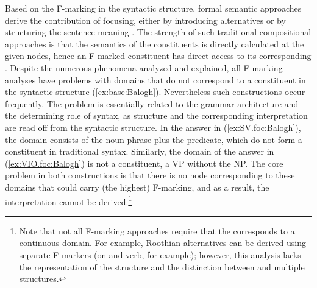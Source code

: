 \documentclass[output=paper,colorlinks,citecolor=brown]{langscibook}
\begin{document}
Based on the F-marking in the syntactic structure, formal semantic approaches derive the contribution of focusing, either by introducing alternatives \citep[see][]{rooth:92} or by structuring the sentence meaning \citep[see][]{vonstechow:91,krifka:01}. The strength of such traditional compositional approaches is that the semantics of the constituents is directly calculated at the given nodes, hence an F-marked constituent has direct access to its corresponding . Despite the numerous phenomena analyzed and explained, all F-marking analyses have problems with  domains that do not correspond to a constituent in the syntactic structure (\ref{ex:base:Balogh}). Nevertheless such constructions occur frequently. The problem is essentially related to the grammar architecture and the determining role of syntax, as  structure and the corresponding interpretation are read off from the syntactic structure. In the answer in (\ref{ex:SV.foc:Balogh}), the  domain consists of the  noun phrase plus the predicate, which do not form a constituent in traditional syntax. Similarly, the  domain of the answer in (\ref{ex:VIO.foc:Balogh}) is not a constituent, a VP without the  NP. The core problem in both constructions is that there is no node corresponding to these  domains that could carry (the highest) F-marking, and as a result, the  interpretation cannot be derived.\footnote{Note that not all F-marking approaches require that the  corresponds to a continuous domain. For example, Roothian alternatives can be derived using separate F-markers (on  and verb, for example); however, this analysis lacks the representation of the  structure and the distinction between  and multiple  structures.}

\end{document}
